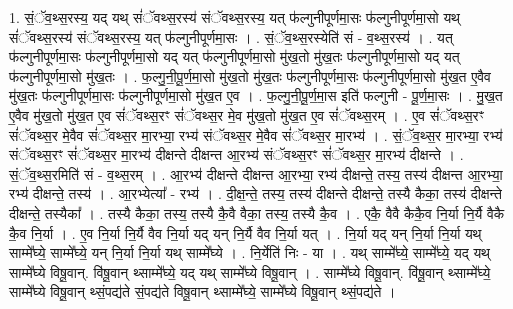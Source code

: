 \documentclass[17pt]{extarticle}
\begin{document}
1. सं॒ॅव॒थ्स॒रस्य॒ यद् यथ् सं॑ॅवथ्स॒रस्य॑ संॅवथ्स॒रस्य॒ यत् फ॑ल्गुनीपूर्णमा॒सः फ॑ल्गुनीपूर्णमा॒सो यथ् सं॑ॅवथ्स॒रस्य॑ संॅवथ्स॒रस्य॒ यत् फ॑ल्गुनीपूर्णमा॒सः । . सं॒ॅव॒थ्स॒रस्येति॑ सं - व॒थ्स॒रस्य॑ । . यत् फ॑ल्गुनीपूर्णमा॒सः फ॑ल्गुनीपूर्णमा॒सो यद् यत् फ॑ल्गुनीपूर्णमा॒सो मु॑ख॒तो मु॑ख॒तः फ॑ल्गुनीपूर्णमा॒सो यद् यत् फ॑ल्गुनीपूर्णमा॒सो मु॑ख॒तः । . फ॒ल्गु॒नी॒पू॒र्ण॒मा॒सो मु॑ख॒तो मु॑ख॒तः फ॑ल्गुनीपूर्णमा॒सः फ॑ल्गुनीपूर्णमा॒सो मु॑ख॒त ए॒वैव मु॑ख॒तः फ॑ल्गुनीपूर्णमा॒सः फ॑ल्गुनीपूर्णमा॒सो मु॑ख॒त ए॒व । . फ॒ल्गु॒नी॒पू॒र्ण॒मा॒स इति॑ फल्गुनी - पू॒र्ण॒मा॒सः । . मु॒ख॒त ए॒वैव मु॑ख॒तो मु॑ख॒त ए॒व सं॑ॅवथ्स॒रꣳ सं॑ॅवथ्स॒र मे॒व मु॑ख॒तो मु॑ख॒त ए॒व सं॑ॅवथ्स॒रम् । . ए॒व सं॑ॅवथ्स॒रꣳ सं॑ॅवथ्स॒र मे॒वैव सं॑ॅवथ्स॒र मा॒रभ्या॒ रभ्य॑ संॅवथ्स॒र मे॒वैव सं॑ॅवथ्स॒र मा॒रभ्य॑ । . सं॒ॅव॒थ्स॒र मा॒रभ्या॒ रभ्य॑ संॅवथ्स॒रꣳ सं॑ॅवथ्स॒र मा॒रभ्य॑ दीक्षन्ते दीक्षन्त आ॒रभ्य॑ संॅवथ्स॒रꣳ सं॑ॅवथ्स॒र मा॒रभ्य॑ दीक्षन्ते । . सं॒ॅव॒थ्स॒रमिति॑ सं - व॒थ्स॒रम् । . आ॒रभ्य॑ दीक्षन्ते दीक्षन्त आ॒रभ्या॒ रभ्य॑ दीक्षन्ते॒ तस्य॒ तस्य॑ दीक्षन्त आ॒रभ्या॒ रभ्य॑ दीक्षन्ते॒ तस्य॑ । . आ॒रभ्येत्या᳚ - रभ्य॑ । . दी॒क्ष॒न्ते॒ तस्य॒ तस्य॑ दीक्षन्ते दीक्षन्ते॒ तस्यै कैका॒ तस्य॑ दीक्षन्ते दीक्षन्ते॒ तस्यैका᳚ । . तस्यै कैका॒ तस्य॒ तस्यै कै॒वै वैका॒ तस्य॒ तस्यै कै॒व । . एकै॒ वैवै कैकै॒व नि॒र्या नि॒र्यै वैकै कै॒व नि॒र्या । . ए॒व नि॒र्या नि॒र्यै वैव नि॒र्या यद् यन् नि॒र्यै वैव नि॒र्या यत् । . नि॒र्या यद् यन् नि॒र्या नि॒र्या यथ् साम्मे᳚घ्ये॒ साम्मे᳚घ्ये॒ यन् नि॒र्या नि॒र्या यथ् साम्मे᳚घ्ये । . नि॒र्येति॑ निः - या । . यथ् साम्मे᳚घ्ये॒ साम्मे᳚घ्ये॒ यद् यथ् साम्मे᳚घ्ये विषू॒वान्. वि॑षू॒वान् थ्साम्मे᳚घ्ये॒ यद् यथ् साम्मे᳚घ्ये विषू॒वान् । . साम्मे᳚घ्ये विषू॒वान्. वि॑षू॒वान् थ्साम्मे᳚घ्ये॒ साम्मे᳚घ्ये विषू॒वान् थ्सं॒पद्य॑ते सं॒पद्य॑ते विषू॒वान् थ्साम्मे᳚घ्ये॒ साम्मे᳚घ्ये विषू॒वान् थ्सं॒पद्य॑ते । \newline
\end{document}
